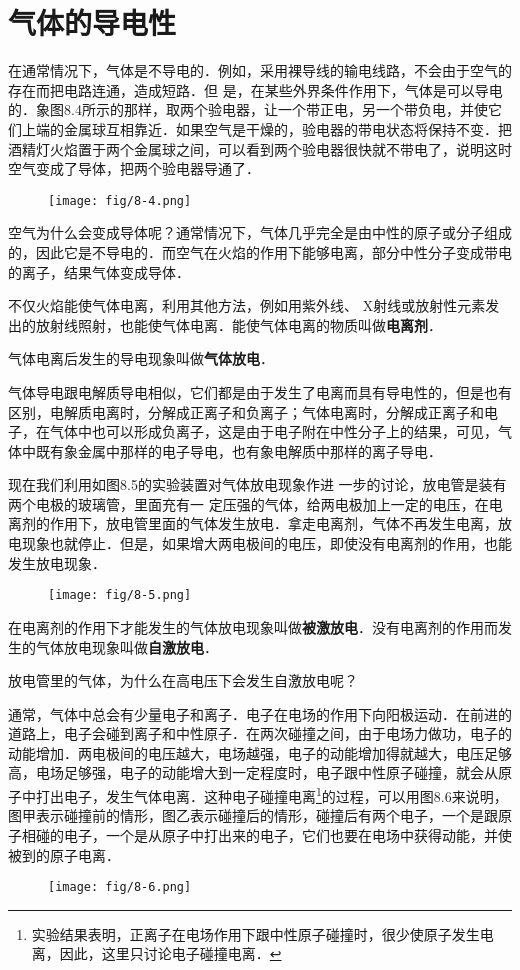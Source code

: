 \section{气体的导电性}
在通常情况下，气体是不导电的．例如，采用裸导线的输电线路，不会由于空气的存在而把电路连通，造成短路．但
是，在某些外界条件作用下，气体是可以导电的．象图8.4所示的那样，取两个验电器，让一个带正电，另一个带负电，并使它们上端的金属球互相靠近．如果空气是干燥的，验电器的带电状态将保持不变．把酒精灯火焰置于两个金属球之间，可以看到两个验电器很快就不带电了，说明这时空气变成了导体，把两个验电器导通了．
\begin{figure}[htp]\centering
    \texttt{[image: fig/8-4.png]}
    \caption{}
    \end{figure}

空气为什么会变成导体呢？通常情况下，气体几乎完全是由中性的原子或分子组成的，因此它是不导电的．而空气在火焰的作用下能够电离，部分中性分子变成带电的离子，结果气体变成导体．

不仅火焰能使气体电离，利用其他方法，例如用紫外线、
X射线或放射性元素发出的放射线照射，也能使气体电离．能使气体电离的物质叫做\textbf{电离剂}．

气体电离后发生的导电现象叫做\textbf{气体放电}．

气体导电跟电解质导电相似，它们都是由于发生了电离而具有导电性的，但是也有区别，电解质电离时，分解成正离子和负离子；气体电离时，分解成正离子和电子，在气体中也可以形成负离子，这是由于电子附在中性分子上的结果，可见，气体中既有象金属中那样的电子导电，也有象电解质中那样的离子导电．

现在我们利用如图8.5的实验装置对气体放电现象作进
一步的讨论，放电管是装有两个电极的玻璃管，里面充有一
定压强的气体，给两电极加上一定的电压，在电离剂的作用下，放电管里面的气体发生放电．拿走电离剂，气体不再发生电离，放电现象也就停止．但是，如果增大两电极间的电压，即使没有电离剂的作用，也能发生放电现象．
\begin{figure}[htp]\centering
    \texttt{[image: fig/8-5.png]}
    \caption{}
    \end{figure}

在电离剂的作用下才能发生的气体放电现象叫做\textbf{被激放电}．没有电离剂的作用而发生的气体放电现象叫做\textbf{自激放电}．

放电管里的气体，为什么在高电压下会发生自激放电呢？

通常，气体中总会有少量电子和离子．电子在电场的作用下向阳极运动．在前进的道路上，电子会碰到离子和中性原子．在两次碰撞之间，由于电场力做功，电子的动能增加．两电极间的电压越大，电场越强，电子的动能增加得就越大，电压足够高，电场足够强，电子的动能增大到一定程度时，电子跟中性原子碰撞，就会从原子中打出电子，发生气体电离．这种电子碰撞电离\footnote{实验结果表明，正离子在电场作用下跟中性原子碰撞时，很少使原子发生电离，因此，这里只讨论电子碰撞电离．}的过程，可以用图8.6来说明，图甲表示碰撞前的情形，图乙表示碰撞后的情形，碰撞后有两个电子，一个是跟原子相碰的电子，一个是从原子中打出来的电子，它们也要在电场中获得动能，并使被到的原子电离．
\begin{figure}[htp]\centering
    \texttt{[image: fig/8-6.png]}
    \caption{}
    \end{figure}

